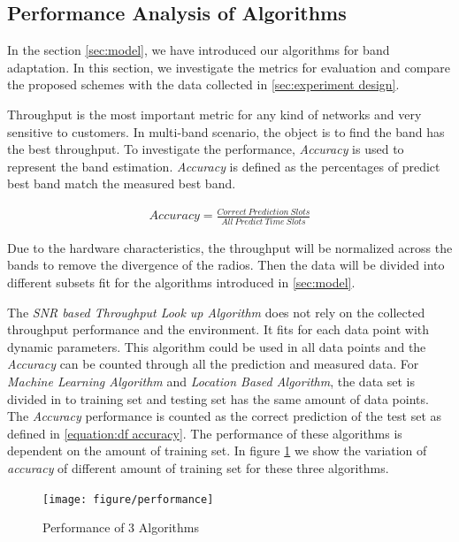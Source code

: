 \subsection{Performance Analysis of Algorithms}
\label{subsec:data process}

In the section \ref{sec:model}, we have introduced our algorithms for band adaptation. 
In this section, we investigate the metrics for evaluation and compare the proposed schemes with the data collected in
\ref{sec:experiment design}.

Throughput is the most important metric for any kind of networks and very sensitive to customers. In multi-band scenario, the object is to find the band has the best throughput.  
To investigate the performance, \emph{Accuracy} is used to represent the band estimation.
\emph{Accuracy} is defined as the percentages of predict best band match the measured best band.


\begin{align}
\label{equation:df accuracy}
Accuracy = \frac{Correct\ Prediction\ Slots}{All\ Predict\ Time\ Slots}
\end{align}

Due to the hardware characteristics, the throughput will be normalized across the bands to remove the divergence of the radios. Then the data will be divided into different subsets fit for the algorithms introduced in 
\ref{sec:model}.

The \emph{SNR based Throughput Look up Algorithm} does not rely on the collected throughput performance and the environment. It fits for each data point with dynamic parameters.
This algorithm could be used in all data points and the \emph{Accuracy} can be counted through all the prediction and measured data.
For \emph{Machine Learning Algorithm} and \emph{Location Based Algorithm}, the data set is divided in to training set and testing set has the same amount of data points.
The \emph{Accuracy} performance is counted as the correct prediction of the test set as defined in \ref{equation:df accuracy}. 
The performance of these algorithms is dependent on the amount of training set. In figure \ref{fig:performance} we show the variation of \emph{accuracy} of different amount of training set for these three algorithms.



\begin{figure}
\centering
\texttt{[image: figure/performance]}
\caption{Performance of 3 Algorithms}
\label{fig:performance}
\end{figure}


